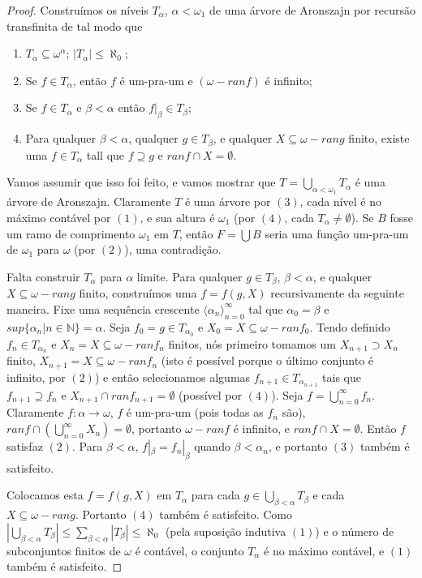 \documentclass[a4paper]{article}
\theoremstyle{plain}\newtheorem{teo}{Teorema}[section]
\theoremstyle{plain}\newtheorem{prop}[teo]{Proposição}
\theoremstyle{plain}\newtheorem{lem}[teo]{Lema}
\theoremstyle{plain}\newtheorem{cor}[teo]{Corolário}
\theoremstyle{definition}\newtheorem{defi}[teo]{Definição}
\theoremstyle{remark}\newtheorem{rem}[teo]{Observação}
\theoremstyle{definition}\newtheorem{example}[teo]{Exemplo}
\theoremstyle{remark}\newtheorem{step}{\bf Step}
\begin{document}
\begin{proof}
  Construímos os níveis $T_{\alpha}$, $\alpha < \omega_1$ de uma árvore de Aronszajn por recursão transfinita de tal modo que
  
  \begin{enumerate}
      \item $T_{\alpha} \subseteq \omega^{\alpha}$; $\left|T_{\alpha}\right| \le \aleph_0$;
      \item Se $f \in T_{\alpha}$, então $f$ é um-pra-um e $(\omega - ranf)$ é infinito;
      \item Se $f \in T_{\alpha}$ e $\beta < \alpha$ então $f |_{\beta} \in T_{\beta}$;
      \item Para qualquer $\beta < \alpha$, qualquer $g \in T_{\beta}$, e qualquer $X \subseteq \omega - rang$ finito, existe uma $f \in T_{\alpha}$ tall que $f \supseteq g$ e $ranf \cap X = \emptyset$.
  \end{enumerate}
  Vamos assumir que isso foi feito, e vamos mostrar que $T = \bigcup_{\alpha < \omega_1}T_{\alpha}$ é uma árvore de Aronszajn. Claramente $T$ é uma árvore por $(3)$, cada nível é no máximo contável por $(1)$, e sua altura é $\omega_1$ (por $(4)$, cada $T_{\alpha} \neq \emptyset$). Se $B$ fosse um ramo de comprimento $\omega_1$ em $T$, então $F = \bigcup B$ seria uma função um-pra-um de $\omega_1$ para $\omega$ (por $(2)$), uma contradição.
  
  Falta construir $T_{\alpha}$ para $\alpha$ limite. Para qualquer $g \in T_{\beta}$, $\beta < \alpha$, e qualquer $X \subseteq \omega - rang$ finito, construímos uma $f = f(g, X)$ recursivamente da seguinte maneira. Fixe uma sequência crescente $\langle \alpha_n \rangle_{n=0}^{\infty}$ tal que $\alpha_0 = \beta$ e $sup\{\alpha_n | n \in \mathbb{N}\} = \alpha$. Seja $f_0 = g \in T_{\alpha_0}$ e $X_0 = X \subseteq \omega - ranf_0$. Tendo definido $f_n \in T_{\alpha_n}$ e $X_n = X \subseteq \omega - ranf_n$ finitos, nós primeiro tomamos um $X_{n+1} \supset X_n$ finito, $X_{n+1} = X \subseteq \omega - ranf_n$ (isto é possível porque o último conjunto é infinito, por $(2)$) e então selecionamos algumas $f_{n+1} \in T_{\alpha_{n+1}}$ tais que $f_{n+1} \supseteq f_n$ e $X_{n+1} \cap ranf_{n+1} = \emptyset$ (possível por $(4)$). Seja $f = \bigcup_{n = 0}^{\infty}f_n$. Claramente $f: \alpha \rightarrow \omega$, $f$ é um-pra-um (pois todas as $f_n$ são), $ranf \cap (\bigcup_{n = 0}^{\infty} X_n) = \emptyset$, portanto $\omega - ranf$ é infinito, e $ranf \cap X = \emptyset$. Então $f$ satisfaz $(2)$. Para $\beta < \alpha$, $f |_{\beta} = f_{n} |_{\beta}$ quando $\beta < \alpha_n$, e portanto $(3)$ também é satisfeito.
  
  Colocamos esta $f = f(g, X)$ em $T_{\alpha}$ para cada $g \in \bigcup_{\beta < \alpha} T_{\beta}$ e cada $X \subseteq \omega - rang$. Portanto $(4)$ também é satisfeito. Como $|\bigcup_{\beta<\alpha}T_{\beta}| \le \sum_{\beta<\alpha}|T_{\beta}| \le \aleph_0$ (pela suposição indutiva $(1)$) e o número de subconjuntos finitos de $\omega$ é contável, o conjunto $T_{\alpha}$ é no máximo contável, e $(1)$ também é satisfeito.
\end{proof}
\end{document}
